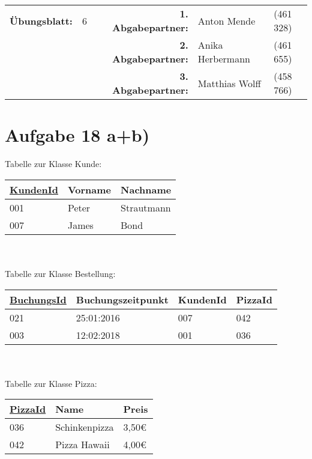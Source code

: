 
\newcommand{\obenlinks}{Software Engineering}		%
\usepackage{float}


	\begin{center}
		\begin{tabular}{|rlp{4cm}rll|}
		\hline
		 \textbf{Übungsblatt:} & 6 &   & \textbf{1. Abgabepartner:} & Anton Mende & (461 328)  \\
		      &  &  & \textbf{2. Abgabepartner:} & Anika Herbermann & (461 655) \\ 
		      &  &  &  \textbf{3. Abgabepartner:} & Matthias Wolff & (458 766) \\
		      \hline
		\end{tabular}
	\end{center}
	\section*{Aufgabe 18 a+b)}
		Tabelle zur Klasse Kunde: \\
		\begin{tabular}{|lll|}
			\hline
			\underline{KundenId} & Vorname & Nachname \\
			\hline
			001 & Peter & Strautmann \\
			007 & James & Bond \\
			\hline
		\end{tabular}
		\\ \\
		Tabelle zur Klasse Bestellung: \\
		\begin{tabular}{|llll|}
			\hline
			\underline{BuchungsId} & Buchungszeitpunkt & KundenId & PizzaId\\
			\hline
			021 & 25:01:2016 & 007 & 042\\
			003 & 12:02:2018 & 001 & 036\\
			\hline
		\end{tabular}
		\\ \\
		Tabelle zur Klasse Pizza: \\
		\begin{tabular}{|lll|}
			\hline
			\underline{PizzaId} & Name & Preis\\
			\hline
			036 & Schinkenpizza & 3,50€ \\
			042 & Pizza Hawaii & 4,00€ \\
			\hline
		\end{tabular}
